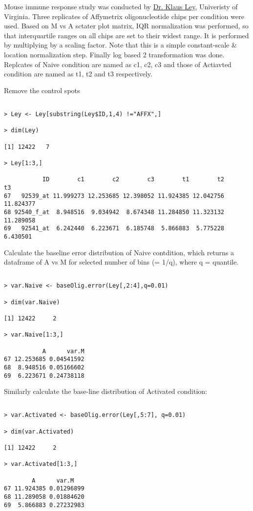 \documentclass[12pt]{article}
\begin{document}
Mouse immune response study was conducted by 
\href{http://hsc.Virginia.EDU/medicine/basic-sci/biomed/ley/}{Dr. Klaus Ley}, Univeristy of Virginia. Three replicates of Affymetrix oligonucleotide chips per condition were used. Based on M vs A sctater plot matrix, IQR normalization was performed, so that interquartile ranges on all chips are set to their widest range. It is performed by multiplying by a scaling factor. Note that this is a simple constant-scale \& location normalization step. Finally log based 2 transformation was done. 
Replcates of Naive condition are named as c1, c2, c3 and those of 
Actiavted condition are named as t1, t2 and t3 respectively.

\vspace{0.5in}

\noindent Remove the control spots
\begin{verbatim}

> Ley <- Ley[substring(Ley$ID,1,4) !="AFFX",] 
	
> dim(Ley)

[1] 12422	7

> Ley[1:3,]

           ID        c1        c2        c3        t1        t2        t3
67   92539_at 11.999273 12.253685 12.398052 11.924385 12.042756 11.824377
68 92540_f_at  8.948516  9.034942  8.674348 11.284850 11.323132 11.289058
69   92541_at  6.242440  6.223671  6.185748  5.866883  5.775228  6.430501

\end{verbatim}
\noindent Calculate the baseline error distribution of Naive contdition, which returns a dataframe of A vs M for selected number of bins (= 1/q), 
where q = quantile. 

\begin{verbatim}

> var.Naive <- baseOlig.error(Ley[,2:4],q=0.01)

> dim(var.Naive)

[1] 12422     2

> var.Naive[1:3,]

           A      var.M
67 12.253685 0.04541592
68  8.948516 0.05166602
69  6.223671 0.24738118

\end{verbatim}
\noindent Similarly calculate the base-line distribution of Activated condition:

\begin{verbatim}

> var.Activated <- baseOlig.error(Ley[,5:7], q=0.01)

> dim(var.Activated)

[1] 12422     2

> var.Activated[1:3,]

        A      var.M
67 11.924385 0.01296899
68 11.289058 0.01884620
69  5.866883 0.27232983

\end{verbatim}
\end{document}

